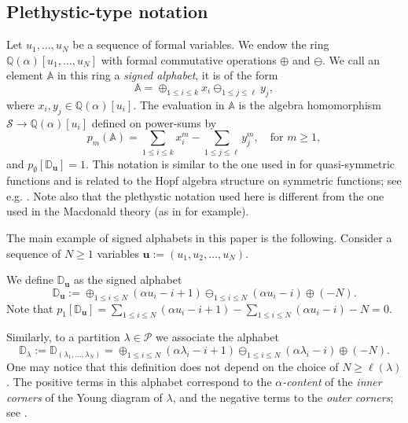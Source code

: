 \documentclass[12pt]{amsart}
\theoremstyle{remark}
\newcommand{\bfu}{\boldsymbol{u}}
\newcommand{\QQ}{\mathbb Q}
\newcommand{\bA}{\mathbb A}
\newcommand{\bD}{\mathbb D}
\newcommand{\YY}{\mathcal{P}}
\newcommand{\mcS}{\mathcal{S}}
\begin{document}
\subsection{Plethystic-type notation}\label{ssec:pleth_notation}
Let $u_1,\dots,u_N$ be a sequence of formal variables. We endow the ring $\QQ(\alpha)[u_1,\dots,u_N]$ with formal commutative operations $\oplus$ and $\ominus$. We call an element $\bA$ in this ring a \emph{signed alphabet}, it is of the form 
$$\bA=\mathop{\oplus}_{1\leq i\leq  k} x_i\mathop{\ominus}_{1\leq j\leq \ell} y_j,$$
where $x_i,y_j\in\QQ(\alpha)[u_i]$. The evaluation in $\bA$ is the algebra homomorphism $\mcS\rightarrow\QQ(\alpha)[u_i]$ defined on power-sums by
\begin{equation}\label{eq:subs_A}
  p_m(\bA)=\sum_{1\leq i\leq k}x_i^m-\sum_{1\leq j\leq \ell}y_j^m, \quad \text{for $m\geq 1$},  
\end{equation}
and $p_{\emptyset}[\bD_{\bfu}]=1$.
This notation is similar to the one used in \cite{AvalFerayNovelliThibon2015} for quasi-symmetric functions and is related to the Hopf algebra structure on symmetric functions; see e.g. \cite[Section 2]{GrinbergReiner2014}. Note also that the plethystic notation used here is different from the one used in the Macdonald theory (as in \cite[Chapter 1]{Haglund2008} for example).

The main example of signed alphabets in this paper is the following.
Consider a sequence of $N\geq 1$ variables $\bfu:=(u_1,u_2,\dots,u_N)$.

    We define $\bD_{\bfu}$ as the signed alphabet
    \begin{equation}\label{def:Du}
      \bD_{\bfu}:=\oplus_{1\leq i\leq N} (\alpha u_i-i+1)\ominus_{1\leq i\leq N}(\alpha u_i-i)\oplus (-N).  
    \end{equation}
Note that
$p_1[\bD_{\bfu}]=\sum_{1\leq i\leq N}(\alpha u_i-i+1)-\sum_{1\leq i\leq N}(\alpha u_i-i)-N=0.$


Similarly, to a partition $\lambda\in\YY$ we associate the alphabet
    $$\bD_{\lambda}:=\bD_{(\lambda_1,\dots,\lambda_N)}=\oplus_{1\leq i\leq N} (\alpha \lambda_i-i+1)\ominus_{1\leq i\leq N}(\alpha \lambda_i-i)\oplus (-N).$$
    One may notice that this definition does not depend on the choice of $N\geq \ell(\lambda)$. 
    The positive terms in this alphabet correspond to the \emph{$\alpha$-content} of the \emph{inner corners} of the Young diagram of $\lambda$, and the negative terms to the \emph{outer corners}; see \cite[Section 2]{DolegaFeray2016}.
    
\end{document}
